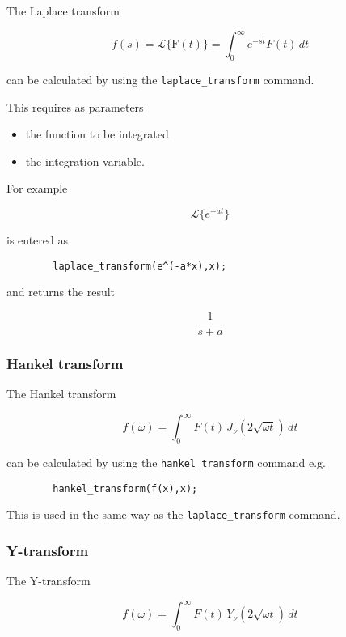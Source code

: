 The Laplace transform

\[
f(s) = \mathcal{L}\{\mathrm{F}(t)\} = \int_{0}^{\infty} e^{-st}F(t)\,dt
\]

can be calculated by using the \verb+laplace_transform+ command.

This requires as parameters

\begin{itemize}
\item the function to be integrated
\item the integration variable.
\end{itemize}

For example

\[
\mathcal{L}\{e^{-at}\}
\]

is entered as

\begin{verbatim}
        laplace_transform(e^(-a*x),x);
\end{verbatim}

and returns the result

\[
\frac{1}{s+a}
\]

\subsubsection{Hankel transform}
\hypertarget{operator:HANKEL_TRANSFORM}{}

The Hankel transform

\[
f(\omega) = \int_{0}^{\infty} F(t) \,J_{\nu}(2\sqrt{\omega t}) \,dt
\]

can be calculated by using the \verb+hankel_transform+ command e.g.

\begin{verbatim}
        hankel_transform(f(x),x);
\end{verbatim}

This is used in the same way as the \verb+laplace_transform+ command.

\subsubsection{Y-transform}
\hypertarget{operator:Y_TRANSFORM}{}

The Y-transform

\[
f(\omega) = \int_{0}^{\infty} F(t) \,Y_{\nu}(2\sqrt{\omega t}) \,dt
\]

